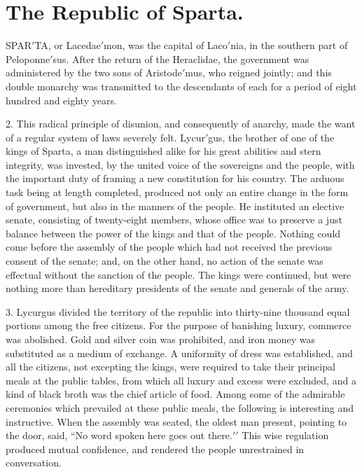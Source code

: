 \documentclass[openany,a4paper]{memoir}
\begin{document}
\chapter{The Republic of Sparta.} 

SPAR$'$TA, or Lacedae$'$mon, was the capital of Laco$'$nia, in the 
southern part of Peloponne$'$sus. After the return of the 
Heraclidae, the government was administered by the two sons 
of Aristode$'$mus, who reigned jointly; and this double monarchy was transmitted to the descendants of each for a period 
of eight hundred and eighty years. 

2. This radical principle of disunion, and consequently of 
anarchy, made the want of a regular system of laws severely 
felt. Lycur$'$gus, the brother of one of the kings of Sparta, 
a man distinguished alike for his great abilities and stern integrity, was invested, by the united voice of the sovereigns 
and the people, with the important duty of framing a new 
constitution for his country. The arduous task being at 
length completed, produced not only an entire change in the 
form of government, but also in the manners of the people. 
He instituted an elective senate, consisting of twenty-eight 
members, whose office was to preserve a just balance between 
the power of the kings and that of the people. Nothing 
could come before the assembly of the people which had not 
received the previous consent of the senate; and, on the other 
hand, no action of the senate was effectual without the sanction of the people. The kings were continued, but were 
nothing more than hereditary presidents of the senate and 
generals of the army. 

3. Lycurgus divided the territory of the republic into 
thirty-nine thousand equal portions among the free citizens. 
For the purpose of banishing luxury, commerce was abolished. Gold and silver coin was prohibited, and iron money 
was substituted as a medium of exchange. A uniformity of 
dress was established, and all the citizens, not excepting the 
kings, were required to take their principal meals at the public 
tables, from which all luxury and excess were excluded, and 
a kind of black broth was the chief article of food. Among 
some of the admirable ceremonies which prevailed at these 
public meals, the following is interesting and instructive. 
When the assembly was seated, the oldest man present, pointing to the door, said, ``No word spoken here goes out there.$'$$'$ 
This wise regulation produced mutual confidence, and rendered the people unrestrained in conversation. 
\end{document}
